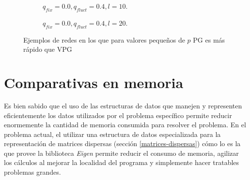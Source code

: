 \pgfplotsset{width=6.5cm}
\begin{figure}[ht]
	\captionsetup[subfigure]{justification=centering, belowskip=3mm}
	\begin{subfigure}{0.45\textwidth}
  \caption{$q_{fix}=0.0, q_{fluct}=0.4, l=10$.}
  \end{subfigure}
  \hfill
  \begin{subfigure}{0.45\textwidth}
  \caption{$q_{fix}=0.0, q_{fluct}=0.4, l=20$.}
  \end{subfigure}
  \caption{Ejemplos de redes en los que para valores pequeños de $p$ PG es más rápido que VPG}
  \label{fig:pg-mas-rapido-vpg}
\end{figure}

\section{Comparativas en memoria}
Es bien sabido que el uso de las estructuras de datos que manejen y representen eficientemente los datos utilizados por el problema específico permite reducir enormemente la cantidad de memoria consumida para resolver el problema. En el problema actual, el utilizar una estructura de datos especializada para la representación de matrices dispersas (sección \ref{matrices-dispersas}) cómo lo es la que provee la biblioteca \emph{Eigen} permite reducir el consumo de memoria, agilizar los cálculos al mejorar la localidad del programa y simplemente hacer tratables problemas grandes. 

